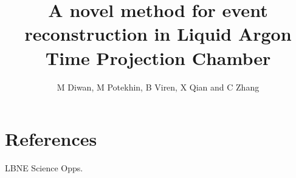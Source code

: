 \documentclass[a4paper]{jpconf}
\begin{document}
\title{A novel method for event reconstruction in Liquid Argon Time Projection Chamber}

\author{M Diwan, M Potekhin, B Viren, X Qian and C Zhang}

\address{Brookhaven National Laboratory, Upton, NY11973, USA}








\section*{References}
\begin{thebibliography}{9}
 LBNE Science Opps. 
\end{thebibliography}
\end{document}
